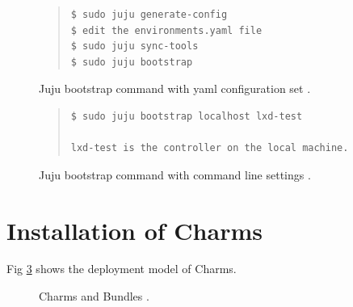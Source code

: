 \documentclass[9pt,twocolumn,twoside]{../../styles/osajnl}
\begin{document}
\begin{figure}
  \centering
  \caption{Juju bootstrap command with yaml configuration set \cite{www-juju}.}
  \label{fig:bootstrap}
  \begin{quote}
    \begin{Verbatim}
$ sudo juju generate-config
$ edit the environments.yaml file
$ sudo juju sync-tools
$ sudo juju bootstrap
    \end{Verbatim}
  \end{quote}
\end{figure}

\begin{figure}
  \caption{Juju bootstrap command with command line settings \cite{www-juju}.}
  \label{fig:bootstrapcmd}
  \begin{quote}
    \begin{Verbatim}
$ sudo juju bootstrap localhost lxd-test

lxd-test is the controller on the local machine.
    \end{Verbatim}
  \end{quote}
\end{figure}


\section{Installation of Charms}
Fig \ref{fig:charms-bundles-2x} shows the deployment model of Charms.

\begin{figure}[htbp]
  \centering
  \caption{Charms and Bundles \cite{www-juju}.}
  \label{fig:charms-bundles-2x}
\end{figure}
\end{document}
